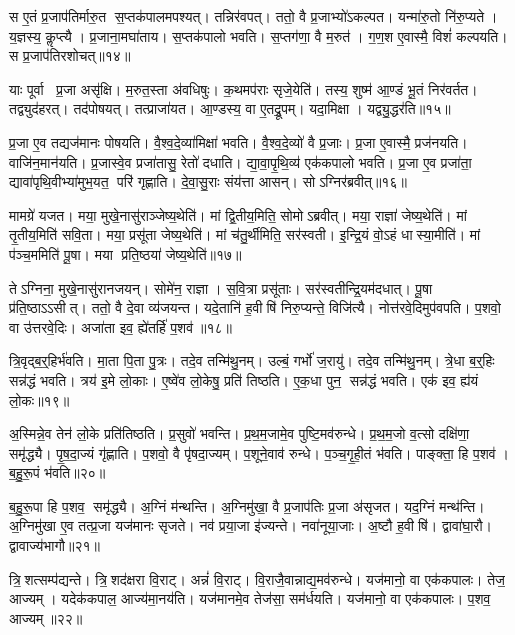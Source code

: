स ए॒तं प्र॒जाप॑तिर्मारु॒त स॒प्तक॑पालमपश्यत्।
तन्निर॑वपत्।
ततो॒ वै प्र॒जाभ्यो॑ऽकल्पत।
यन्मा॑रु॒तो नि॑रु॒प्यते।
य॒ज्ञस्य॒ कॢप्त्यै।
प्र॒जाना॒मघा॑ताय।
स॒प्तक॑पालो भवति।
स॒प्तग॑णा॒ वै म॒रुत॑।
ग॒ण॒श ए॒वास्मै॒ विशं॑ कल्पयति।
स प्र॒जाप॑तिरशोचत्॥१४॥

याः पूर्वा प्र॒जा असृ॑क्षि।
म॒रुत॒स्ता अ॑वधिषुः।
क॒थमप॑राः सृजे॒येति॑।
तस्य॒ शुष्म॑ आ॒ण्डं भू॒तं निर॑वर्तत।
तद्व्युद॑हरत्।
तद॑पोषयत्।
तत्प्राजा॑यत।
आ॒ण्डस्य॒ वा ए॒तद्रू॒पम्।
यदा॒मिक्षा।
यद्व्यु॒द्धर॑ति॥१५॥

प्र॒जा ए॒व तद्यज॑मानः पोषयति।
वै॒श्व॒दे॒व्या॑मिक्षा॑ भवति।
वै॒श्व॒दे॒व्यो॑ वै प्र॒जाः।
प्र॒जा ए॒वास्मै॒ प्रज॑नयति।
वाजि॑न॒मान॑यति।
प्र॒जास्वे॒व प्रजा॑तासु॒ रेतो॑ दधाति।
द्या॒वा॒पृ॒थि॒व्य॑ एक॑कपालो भवति।
प्र॒जा ए॒व प्रजा॑ता॒ द्यावा॑पृथि॒वीभ्या॑मुभ॒यत॒ परि॑ गृह्णाति।
दे॒वा॒सु॒राः संय॑त्ता आसन्।
सोऽग्निर॑ब्रवीत्॥१६॥

मामग्रे॑ यजत।
मया॒ मुखे॒नासु॑राञ्जेष्य॒थेति॑।
मां द्वि॒तीय॒मिति॒ सोमोऽब्रवीत्।
मया॒ राज्ञा॑ जेष्य॒थेति॑।
मां तृ॒तीय॒मिति॑ सवि॒ता।
मया॒ प्रसू॑ता जेष्य॒थेति॑।
मां च॑तु॒र्थीमिति॒ सर॑स्वती।
इ॒न्द्रि॒यं वो॒ऽहं धास्या॒मीति॑।
मां प॑ञ्च॒ममिति॑ पू॒षा।
मया प्रति॒ष्ठया॑ जेष्य॒थेति॑॥१७॥

तेऽग्निना॒ मुखे॒नासु॑रानजयन्।
सोमे॑न॒ राज्ञा।
स॒वि॒त्रा प्रसू॑ताः।
सर॑स्वतीन्द्रि॒यम॑दधात्।
पू॒षा प्र॑ति॒ष्ठाऽऽसीत्।
ततो॒ वै दे॒वा व्य॑जयन्त।
यदे॒तानि॑ ह॒वीषि॑ निरु॒प्यन्ते॒ विजि॑त्यै।
नोत्त॑रवे॒दिमुप॑वपति।
प॒शवो॒ वा उ॑त्तरवे॒दिः।
अजा॑ता इव॒ ह्ये॑तर्\mbox{}हि॑ प॒शव॑॥१८॥\anuvakamend[ऐ॒दित्य॑शोचद्व्यु॒द्धर॑त्यब्रवीत्प्रति॒ष्ठया॑ जेष्य॒थेत्ये॒तर्\mbox{}हि॑ प॒शव॑]

त्रि॒वृद्ब॒र्॒हिर्भ॑वति।
मा॒ता पि॒ता पु॒त्रः।
तदे॒व तन्मि॑थु॒नम्।
उल्बं॒ गर्भो॑ ज॒रायु॑।
तदे॒व तन्मि॑थु॒नम्।
त्रे॒धा ब॒र्॒हिः सन्न॑द्धं भवति।
त्रय॑ इ॒मे लो॒काः।
ए॒ष्वे॑व लो॒केषु॒ प्रति॑ तिष्ठति।
ए॒क॒धा पुन॒ सन्न॑द्धं भवति।
एक॑ इव॒ ह्य॑यं लो॒कः॥१९॥

अ॒स्मिन्ने॒व तेन॑ लो॒के प्रति॑तिष्ठति।
प्र॒सुवो॑ भवन्ति।
प्र॒थ॒म॒जामे॒व पुष्टि॒मव॑रुन्धे।
प्र॒थ॒म॒जो व॒त्सो दक्षि॑णा॒ समृ॑द्ध्यै।
पृ॒ष॒दा॒ज्यं गृ॑ह्णाति।
प॒शवो॒ वै पृ॑षदा॒ज्यम्।
प॒शूने॒वाव॑ रुन्धे।
प॒ञ्च॒गृ॒ही॒तं भ॑वति।
पाङ्क्ता॒ हि प॒शव॑।
ब॒हु॒रू॒पं भ॑वति॥२०॥

ब॒हु॒रू॒पा हि प॒शव॒ समृ॑द्ध्यै।
अ॒ग्निं म॑न्थन्ति।
अ॒ग्निमु॑खा॒ वै प्र॒जाप॑तिः प्र॒जा अ॑सृजत।
यद॒ग्निं मन्थ॑न्ति।
अ॒ग्निमु॑खा ए॒व तत्प्र॒जा यज॑मानः सृजते।
नव॑ प्रया॒जा इ॑ज्यन्ते।
नवा॑नूया॒जाः।
अ॒ष्टौ ह॒वीषि॑।
द्वावा॑घा॒रौ।
द्वावाज्य॑भागौ॥२१॥

त्रि॒शत्सम्प॑द्यन्ते।
त्रि॒शद॑क्षरा वि॒राट्।
अन्नं॑ वि॒राट्।
वि॒राजै॒वान्नाद्य॒मव॑रुन्धे।
यज॑मानो॒ वा एक॑कपालः।
तेज॒ आज्यम्।
यदेक॑कपाल॒ आज्य॑मा॒नय॑ति।
यज॑मानमे॒व तेज॑सा॒ सम॑र्धयति।
यज॑मानो॒ वा एक॑कपालः।
प॒शव॒ आज्यम्॥२२॥

